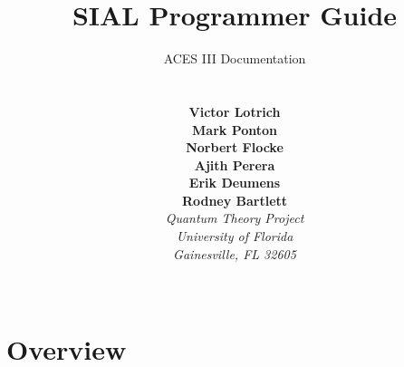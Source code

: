 \documentclass[12pt]{article}
\begin{document}
\title{SIAL Programmer Guide}

\author{
  ACES III Documentation \\
  \\
  \\
  {\bf Victor Lotrich} \\
  {\bf Mark Ponton} \\
  {\bf Norbert Flocke} \\
  {\bf Ajith Perera} \\
  {\bf Erik Deumens} \\
  {\bf Rodney Bartlett} \\
{\em Quantum Theory Project} \\
{\em University of Florida} \\
{\em Gainesville, FL 32605} \\
\\
}
\maketitle

\newpage

\section{\bf Overview}
\end{document}
